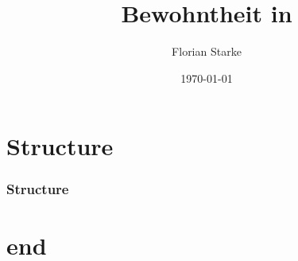 \documentclass{beamer}
\title{Bewohntheit in \lambdaTwo}
\author{Florian	Starke}
\date{\today}
\begin{document}
\maketitle
\addtocounter{framenumber}{-1}

\section*{Structure}
\begin{frame}
\frametitle{Structure}
\tableofcontents 
\end{frame}

\section*{end}
\end{document}
